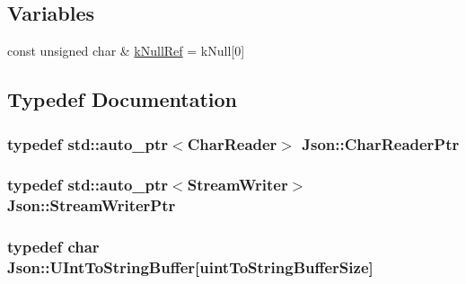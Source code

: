 \subsection*{Variables}
\begin{DoxyCompactItemize}
\item 
const unsigned char \& \hyperlink{namespace_json_ab30055b4bbd82aecaca57ccecd63bbe6}{k\+Null\+Ref} = k\+Null\mbox{[}0\mbox{]}
\end{DoxyCompactItemize}


\subsection{Typedef Documentation}
\hypertarget{namespace_json_a4724efb8d41614b47036cb8b54233837}{}
\subsubsection[{Char\+Reader\+Ptr}]{\setlength{\rightskip}{0pt plus 5cm}typedef std\+::auto\+\_\+ptr$<$Char\+Reader$>$ {\bf Json\+::\+Char\+Reader\+Ptr}}\label{namespace_json_a4724efb8d41614b47036cb8b54233837}
\hypertarget{namespace_json_a7132404aeebfc96d7c6ad2c66260afb5}{}
\subsubsection[{Stream\+Writer\+Ptr}]{\setlength{\rightskip}{0pt plus 5cm}typedef std\+::auto\+\_\+ptr$<$Stream\+Writer$>$ {\bf Json\+::\+Stream\+Writer\+Ptr}}\label{namespace_json_a7132404aeebfc96d7c6ad2c66260afb5}
\hypertarget{namespace_json_a602bcf69c2042fb61c3b243cb16f04ca}{}
\subsubsection[{U\+Int\+To\+String\+Buffer}]{\setlength{\rightskip}{0pt plus 5cm}typedef char Json\+::\+U\+Int\+To\+String\+Buffer\mbox{[}{\bf uint\+To\+String\+Buffer\+Size}\mbox{]}}\label{namespace_json_a602bcf69c2042fb61c3b243cb16f04ca}


